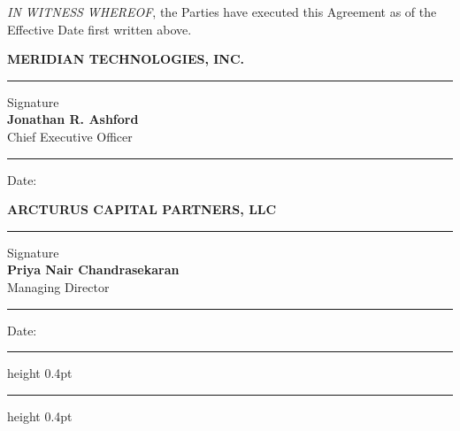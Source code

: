 \documentclass[11pt, a4paper]{article}
\newcommand{\sigblock}[4]{%
  \begin{minipage}[t]{0.44\textwidth}
    \vspace{0pt}
    {\small\bfseries\color{accent} #1}\\[18pt]
    \hrule\vspace{4pt}
    {\small Signature}\\[10pt]
    \textbf{#2}\\[2pt]
    {\small #3}\\[10pt]
    \hrule\vspace{4pt}
    {\small Date: #4}
  \end{minipage}%
}
\begin{document}
\vspace{16pt}
\noindent
\textit{IN WITNESS WHEREOF}, the Parties have executed this Agreement as of the
Effective Date first written above.

\vspace{22pt}

\noindent
\sigblock{MERIDIAN TECHNOLOGIES, INC.}{Jonathan R. Ashford}{Chief Executive Officer}{\underline{\hspace{5cm}}}%
\hfill
\sigblock{ARCTURUS CAPITAL PARTNERS, LLC}{Priya Nair Chandrasekaran}{Managing Director}{\underline{\hspace{5cm}}}

\vspace{30pt}
{\color{rulegray}\hrule height 0.4pt}
{\color{rulegray}\hrule height 0.4pt}
\vspace{2pt}
\end{document}
